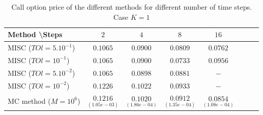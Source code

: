 \documentclass[11pt]{article}
\begin{document}
\begin{table}[h!]
	\centering
	\begin{tabular}{l*{6}{c}r}
		Method \textbackslash  Steps            & $2$ & $4$ & $8$ & $16$  \\
		\hline
		MISC ($TOl=5.10^{-1}$)  & $0.1065$ & $0.0900$ & $0.0809$ & $0.0762$  \\
		MISC ($TOl=10^{-1}$)  &  $0.1065$ &   $0.0900$ & $0.0733$ & $0.0956$  \\
		MISC ($TOl=5.10^{-2}$)        &  $0.1065$ &$0.0898$ &  $0.0881$ &  $-$ \\
		MISC ($TOl=10^{-2}$)    & $0.1226$ & $0.1022$  & $0.0933$ & $-$  \\
		MC method ($M=10^{6}$)   & $\underset{(1.05e-03)}{0.1216} $  & $\underset{(1.86e-04)}{0.1020} $  & $\underset{ (1.35e-04)}{0.0912}$ & $\underset {(1.08e-04)}{0.0854} $  \\		
		\hline
	\end{tabular}
	\caption{ Call option price of the different methods for different number of time steps. Case $K=1$}
	\label{table: Call option price of the different methods for different number of time steps. Case $K=1$_H_007}
\end{table}



%
\end{document}
